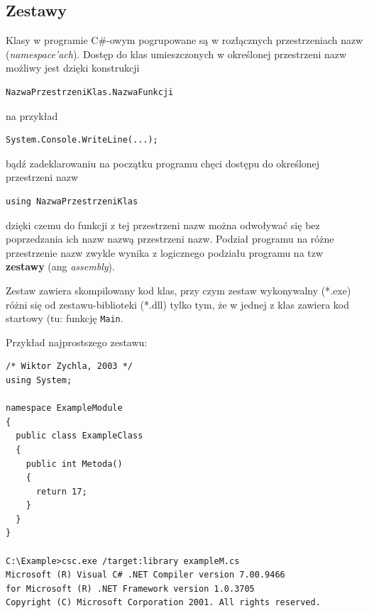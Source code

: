﻿\subsection{Zestawy}

Klasy w programie C\#-owym pogrupowane są w rozłącznych przestrzeniach nazw ({\em namespace'ach}). 
Dostęp do klas umieszczonych w określonej przestrzeni nazw możliwy jest dzięki konstrukcji

\begin{scriptsize}
\begin{verbatim}
NazwaPrzestrzeniKlas.NazwaFunkcji
\end{verbatim}
\end{scriptsize}

na przykład

\begin{scriptsize}
\begin{verbatim}
System.Console.WriteLine(...);
\end{verbatim}
\end{scriptsize}

bądź zadeklarowaniu na początku programu chęci dostępu do określonej przestrzeni nazw

\begin{scriptsize}
\begin{verbatim}
using NazwaPrzestrzeniKlas
\end{verbatim}
\end{scriptsize}

dzięki czemu do funkcji z tej przestrzeni nazw można odwoływać się bez poprzedzania
ich nazw nazwą przestrzeni nazw. Podział programu na różne przestrzenie nazw zwykle wynika
z logicznego podziału programu na tzw {\bf zestawy} (ang {\em assembly}). 

Zestaw zawiera
skompilowany kod klas, przy czym zestaw wykonywalny (*.exe) różni się od zestawu-biblioteki (*.dll) tylko tym, że 
w jednej z klas zawiera kod startowy (tu: funkcję {\tt Main}. 

Przykład najprostszego zestawu:

\begin{scriptsize}
\begin{verbatim}
/* Wiktor Zychla, 2003 */
using System;

namespace ExampleModule
{ 
  public class ExampleClass
  {    
    public int Metoda()
    {
      return 17;
    }
  }
}

C:\Example>csc.exe /target:library exampleM.cs
Microsoft (R) Visual C# .NET Compiler version 7.00.9466
for Microsoft (R) .NET Framework version 1.0.3705
Copyright (C) Microsoft Corporation 2001. All rights reserved.
\end{verbatim}
\end{scriptsize}

